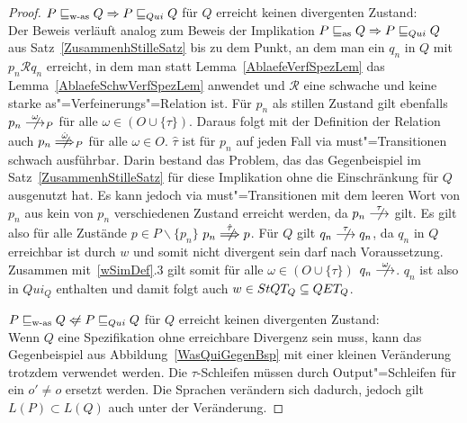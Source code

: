 \begin{proof}
  $P \sqsubseteq _{\mathrm{w}\text{-}\mathrm{as}} Q \Rightarrow P  \sqsubseteq  _{Qui} Q$ für $Q$ erreicht keinen divergenten
  Zustand:\\
  Der Beweis verläuft analog zum Beweis der Implikation $P \sqsubseteq _{\mathrm{as}} Q \Rightarrow
  P  \sqsubseteq  _{Qui} Q$ aus Satz~\ref{ZusammenhStilleSatz} bis zu dem Punkt, an dem man
  ein $q_n$ in $Q$ mit $p_n \mathcal{R} q_n$ erreicht, in dem man statt
  Lemma~\ref{AblaefeVerfSpezLem} das Lemma~\ref{AblaefeSchwVerfSpezLem}
  anwendet und $\mathcal{R}$ eine schwache und keine starke
  as"=Verfeinerungs"=Relation ist. Für $p_n$ als stillen Zustand gilt ebenfalls
  $p_n \nmust[\omega]_P$ für alle $\omega\in (O\cup\{\tau\})$. Daraus folgt mit
  der Definition der Relation \weakmust{} auch $p_n \nweakmust[\hat{\omega}]_P$
  für alle $\omega\in O$. $\hat{\tau}$ ist für $p_n$ auf jeden Fall via \glqq
  must"=Transitionen\grqq{} schwach ausführbar. Darin bestand das Problem, das
  das Gegenbeispiel im Satz~\ref{ZusammenhStilleSatz} für diese Implikation
  ohne die Einschränkung für $Q$ ausgenutzt hat. Es kann jedoch via
  must"=Transitionen mit dem leeren Wort von $p_n$ aus kein von $p_n$
  verschiedenen Zustand erreicht werden, da $p_n \nmust[\tau]$ gilt. Es gilt
  also für alle Zustände $p\in P\backslash \{p_n\}$ $p_n \nweakmust[\hat{\tau}]
  p$. Für $Q$ gilt $q_n \nmust[\tau] q_n$, da $q_n$ in $Q$ erreichbar ist durch
  $w$ und somit nicht divergent sein darf nach Voraussetzung. Zusammen
  mit~\ref{wSimDef}.3 gilt somit für alle $\omega \in (O\cup \{\tau\})$ $q_n
  \nmust[\omega]$. $q_n$ ist also in $Qui_Q$ enthalten und damit folgt auch $w
  \in StQT _Q\subseteq QET _Q$.

  $P \wasRel Q \hspace{0.1cm}\not\hspace{-0.1cm}\Leftarrow P \QRel Q$ für $Q$
  erreicht keinen divergenten Zustand:\\
  Wenn $Q$ eine Spezifikation ohne erreichbare Divergenz sein muss, kann das
  Gegenbeispiel aus Abbildung~\ref{WasQuiGegenBsp} mit einer kleinen
  Veränderung trotzdem verwendet werden. Die $\tau$-Schleifen müssen durch
  Output"=Schleifen für ein $o'\neq o$ ersetzt werden. Die Sprachen verändern
  sich dadurch, jedoch gilt $L(P) \subset L(Q)$ auch unter der Veränderung.
\end{proof}
